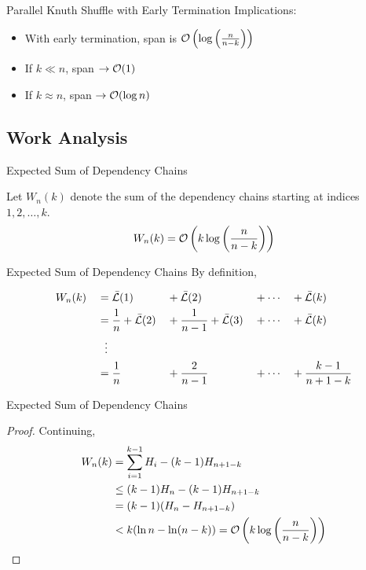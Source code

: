 \begin{frame}{Parallel Knuth Shuffle with Early Termination}
  Implications:
  \begin{itemize}
    \item With early termination, span is \(\mathcal{O}\left(\log\left(\frac{n}{n-k}\right)\right)\)
    \item If \(k \ll n\), span \(\to \mathcal{O}(1)\)
    \item If \(k \approx n\), span \(\to \mathcal{O}(\log n)\)
  \end{itemize}
\end{frame}

\subsection{Work Analysis}

\begin{frame}{Expected Sum of Dependency Chains}
  \begin{theorem}
    Let \(W_n(k)\) denote the sum of the dependency chains starting at indices
    \(1, 2, \dots, k\).
    \[ W_n(k) = \mathcal{O}\left(k \log\left(\frac{n}{n-k}\right)\right) \] 
  \end{theorem}
\end{frame}

\begin{frame}{Expected Sum of Dependency Chains}
  By definition,
  \begin{proofs}
    \begin{alignat*}{5}
      &W_n(k) &&= \bar{\mathcal{L}}(1) &&+\bar{\mathcal{L}}(2) &&+\cdots &&+ \bar{\mathcal{L}}(k) \\
      &       &&= \frac{1}{n} + \bar{\mathcal{L}}(2) &&+ \frac{1}{n-1} + \bar{\mathcal{L}}(3) &&+ \cdots &&+ \bar{\mathcal{L}}(k) \\
      &       &&\ \ \vdots \\ 
      &       &&= \frac{1}{n} &&+ \frac{2}{n-1} &&+ \cdots &&+ \frac{k-1}{n+1-k} \\
    \end{alignat*}
  \end{proofs}
\end{frame}

\begin{frame}{Expected Sum of Dependency Chains}
  \begin{proof}
    Continuing,
    \[
      \begin{aligned}
        W_n(k) &= \sum_{i=1}^{k-1} H_i - (k-1)H_{n+1-k} \\ 
               &\leq (k-1)H_n - (k-1)H_{n+1-k} \\ 
               &= (k-1)(H_n - H_{n+1-k}) \\ 
               &< k(\ln n - \ln(n-k)) = \mathcal{O}\left(k \log\left(\frac{n}{n-k}\right)\right) 
      \end{aligned}
    \]
  \end{proof}
\end{frame}

